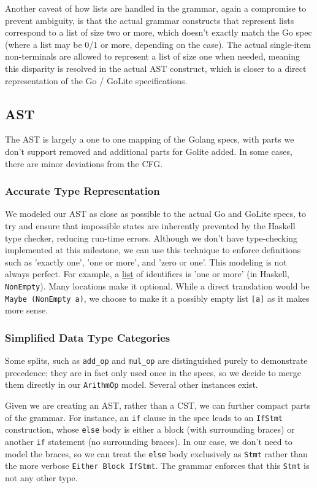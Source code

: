 \documentclass[11pt]{article}
\begin{document}
Another caveat of how lists are handled in the grammar, again a
compromise to prevent ambiguity, is that the actual grammar constructs
that represent lists correspond to a list of size two or more, which
doesn't exactly match the Go spec (where a list may be 0/1 or more,
depending on the case). The actual single-item non-terminals are allowed
to represent a list of size one when needed, meaning this disparity
is resolved in the actual AST construct, which is closer to a direct
representation of the Go / GoLite specifications.
\subsection{AST}
\label{sec:org40e027a}
The AST is largely a one to one mapping of the Golang specs, with
parts we don't support removed and additional parts for Golite added.
In some cases, there are minor deviations from the CFG.
\subsubsection{Accurate Type Representation}
\label{sec:orgc321dba}
We modeled our AST as close as possible to the actual Go and
GoLite specs, to try and ensure that impossible states are inherently
prevented by the Haskell type checker, reducing run-time errors.
Although we don't have type-checking implemented at this milestone,
we can use this technique to enforce definitions such as
'exactly one', 'one or more', and 'zero or one'. This modeling is
not always perfect. For example, a \href{https://golang.org/ref/spec\#IdentifierList}{list}
of identifiers is 'one or more' (in Haskell, \texttt{NonEmpty}). Many locations
make it optional. While a direct translation would be \texttt{Maybe (NonEmpty a)},
we choose to make it a possibly empty list \texttt{[a]} as it makes more sense.
\subsubsection{Simplified Data Type Categories}
\label{sec:orgc001d88}
Some splits, such as \texttt{add\_op} and \texttt{mul\_op} are distinguished
purely to demonstrate precedence; they are in fact only used once
in the specs, so we decide to merge them directly in our \texttt{ArithmOp}
model. Several other instances exist.

Given we are creating an AST, rather than a CST, we can further
compact parts of the grammar. For instance, an \texttt{if} clause in the
spec leads to an \texttt{IfStmt} construction, whose \texttt{else} body is either
a block (with surrounding braces) or another \texttt{if} statement (no
surrounding braces). In our case, we don't need to model the braces,
so we can treat the \texttt{else} body exclusively as \texttt{Stmt} rather than
the more verbose \texttt{Either Block IfStmt}. The grammar enforces that
this \texttt{Stmt} is not any other type.
\end{document}
